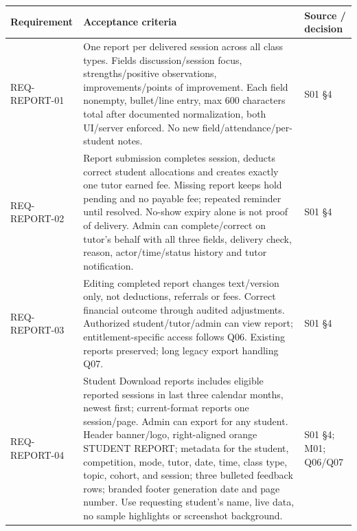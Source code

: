 \documentclass[11pt,a4paper]{article}
\newcounter{none}
\begin{document}
{\def\LTcaptype{none} %
\begin{longtable}[]{@{}
  >{\raggedright\arraybackslash}p{}
  >{\raggedright\arraybackslash}p{}
  >{\raggedright\arraybackslash}p{}@{}}
\toprule\noalign{}
\begin{minipage}[b]{\linewidth}\raggedright
Requirement
\end{minipage} & \begin{minipage}[b]{\linewidth}\raggedright
Acceptance criteria
\end{minipage} & \begin{minipage}[b]{\linewidth}\raggedright
Source / decision
\end{minipage} \\
\midrule\noalign{}
\endhead
\bottomrule\noalign{}
\endlastfoot
REQ-REPORT-01 & One report per delivered session across all class types. Fields discussion/session focus, strengths/positive observations, improvements/points of improvement. Each field nonempty, bullet/line entry, max 600 characters total after documented normalization, both UI/server enforced. No new field/attendance/per-student notes. & S01 §4 \\
REQ-REPORT-02 & Report submission completes session, deducts correct student allocations and creates exactly one tutor earned fee. Missing report keeps hold pending and no payable fee; repeated reminder until resolved. No-show expiry alone is not proof of delivery. Admin can complete/correct on tutor's behalf with all three fields, delivery check, reason, actor/time/status history and tutor notification. & S01 §4 \\
REQ-REPORT-03 & Editing completed report changes text/version only, not deductions, referrals or fees. Correct financial outcome through audited adjustments. Authorized student/tutor/admin can view report; entitlement-specific access follows Q06. Existing reports preserved; long legacy export handling Q07. & S01 §4 \\
REQ-REPORT-04 & Student Download reports includes eligible reported sessions in last three calendar months, newest first; current-format reports one session/page. Admin can export for any student. Header banner/logo, right-aligned orange STUDENT REPORT; metadata for the student, competition, mode, tutor, date, time, class type, topic, cohort, and session; three bulleted feedback rows; branded footer generation date and page number. Use requesting student's name, live data, no sample highlights or screenshot background. & S01 §4; M01; Q06/Q07 \\

\end{longtable}}
\end{document}
